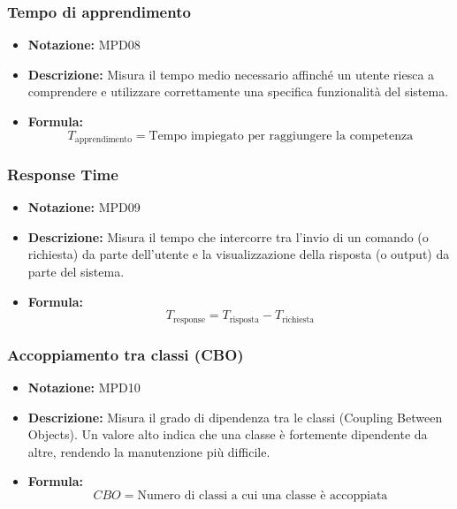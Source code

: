 \documentclass[a4paper,12pt]{article}
\begin{document}
        \subsubsection{Tempo di apprendimento}
            \begin{itemize}
                \item \textbf{Notazione:} MPD08
                \item \textbf{Descrizione:} Misura il tempo medio necessario affinché un utente riesca a comprendere e utilizzare correttamente una specifica funzionalità del sistema.
                \item \textbf{Formula:} 
                \[ T_\text{apprendimento} = \text{Tempo impiegato per raggiungere la competenza} \]
            \end{itemize}

        \subsubsection{Response Time}
            \begin{itemize}
                \item \textbf{Notazione:} MPD09
                \item \textbf{Descrizione:} Misura il tempo che intercorre tra l'invio di un comando (o richiesta) da parte dell'utente e la visualizzazione della risposta (o output) da parte del sistema.
                \item \textbf{Formula:} 
                \[ T_\text{response} = T_\text{risposta} - T_\text{richiesta} \]
            \end{itemize}

        \subsubsection{Accoppiamento tra classi (CBO)}
            \begin{itemize}
                \item \textbf{Notazione:} MPD10
                \item \textbf{Descrizione:} Misura il grado di dipendenza tra le classi (Coupling Between Objects). Un valore alto indica che una classe è fortemente dipendente da altre, rendendo la manutenzione più difficile.
                \item \textbf{Formula:} 
                \[ CBO = \text{Numero di classi a cui una classe è accoppiata} \]
            \end{itemize}
\end{document}
